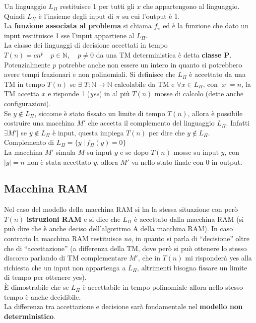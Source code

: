 Un linguaggio $L_\Pi$ restituisce 1 per tutti gli $x$ che appartengono al linguaggio. Quindi $L_\Pi$ è l'insieme degli input di $\pi$ su cui l'output è 1.\\ 
La \textbf{funzione associata al problema} si chiama $f_\pi$ ed è la funzione che dato un input restituisce 1 sse l'input appartiene al $L_\Pi$.  \\
La classe dei linguaggi di decisione accettati in tempo $T(n)=cn^p \quad p\in\mathbb{N}, \quad p\neq 0$ da una TM deterministica è detta \textbf{classe P}. \\ 
Potenzialmente $p$ potrebbe anche non essere un intero in quanto si potrebbero avere tempi frazionari e non polinomiali. Si definisce che $L_\Pi$ è accettato da una TM in tempo $T(n)$ se $\exists \,\,T :\mathbb{N}\to \mathbb{N}$ calcolabile da TM e $\forall x\in L_\Pi$, con $|x|=n$, la TM accetta $x$ e risponde 1 (\textit{yes}) in al più $T(n)$ mosse di calcolo (dette anche configurazioni).\\ 

Se $y \notin L_\Pi$, siccome è stato fissato un limite di tempo $T(n)$, allora è possibile costruire una macchina $M'$ che accetta il complemento del linguaggio $L_\Pi$. Infatti $\exists M' |$ se $y \notin L_{\Pi}$ è input, questa impiega $T(n)$ per dire che $y \notin L_{\Pi}$. \\
Complemento di $L_\Pi = \{y \: | \: f_\Pi (y) = 0\}$ \\
La macchina $M'$ simula $M$ su input $y$ e se dopo $T(n)$ mosse su input $y$, con $|y| = n$ non è stata accettato $y$, allora $M'$ va nello stato finale con $0$ in output.

\subsection{Macchina RAM}
Nel caso del modello della macchina RAM si ha la stessa situazione con però $T(n)$ \textbf{istruzioni RAM} e si dice che $L_\Pi$ è accettato dalla macchina RAM (si può dire che è anche deciso dell'algoritmo A della macchina RAM). In caso contrario la macchina RAM restituisce \textit{no}, in quanto si parla di ``decisione'' oltre che di ``accettazione'' (a differenza della TM, dove però si può ottenere lo stesso discorso parlando di TM complementare $M'$, che in $T(n)$ mi risponderà yes alla richiesta che un input non appartenga a $L_\Pi$, altrimenti bisogna fissare un limite di tempo per ottenere yes).\\ È dimostrabile che se $L_\Pi$ è accettabile in tempo polinomiale allora nello stesso tempo è anche decidibile.\\ La differenza tra accettazione e decisione sarà fondamentale nel \textbf{modello non deterministico}.  

